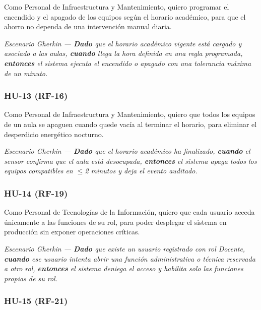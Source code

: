 
Como Personal de Infraestructura y Mantenimiento, quiero programar el encendido y el apagado de los equipos según el horario académico, para que el ahorro no dependa de una intervención manual diaria.

\textit{Escenario Gherkin --- \textbf{Dado} que el horario académico vigente está cargado y asociado a las aulas, \textbf{cuando} llega la hora definida en una regla programada, \textbf{entonces} el sistema ejecuta el encendido o apagado con una tolerancia máxima de un minuto.}

\subsubsection*{HU-13 (RF-16)}


Como Personal de Infraestructura y Mantenimiento, quiero que todos los equipos de un aula se apaguen cuando quede vacía al terminar el horario, para eliminar el desperdicio energético nocturno.

\textit{Escenario Gherkin --- \textbf{Dado} que el horario académico ha finalizado, \textbf{cuando} el sensor confirma que el aula está desocupada, \textbf{entonces} el sistema apaga todos los equipos compatibles en $\leq$2 minutos y deja el evento auditado.}

\subsubsection*{HU-14 (RF-19)}


Como Personal de Tecnologías de la Información, quiero que cada usuario acceda únicamente a las funciones de su rol, para poder desplegar el sistema en producción sin exponer operaciones críticas.

\textit{Escenario Gherkin --- \textbf{Dado} que existe un usuario registrado con rol Docente, \textbf{cuando} ese usuario intenta abrir una función administrativa o técnica reservada a otro rol, \textbf{entonces} el sistema deniega el acceso y habilita solo las funciones propias de su rol.}

\subsubsection*{HU-15 (RF-21)}


